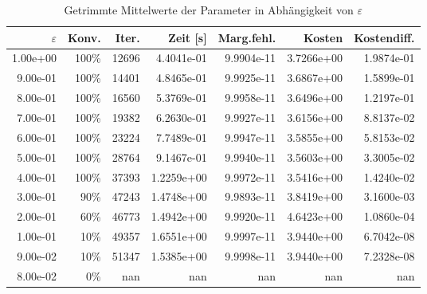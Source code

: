 \begin{table}[htbp]
\caption{Getrimmte Mittelwerte der Parameter in Abhängigkeit von $\varepsilon$}
\label{tab:Parametertest256_tol1e-10}
\small
\centering
{}
\begin{tabular}{rrrrrrr}
\toprule
$\varepsilon$ & Konv. & Iter. & Zeit [s] & Marg.fehl. & Kosten & Kostendiff. \\
\midrule
1.00e+00 & 100\% & 12696 & 4.4041e-01 & 9.9904e-11 & 3.7266e+00 & 1.9874e-01 \\
9.00e-01 & 100\% & 14401 & 4.8465e-01 & 9.9925e-11 & 3.6867e+00 & 1.5899e-01 \\
8.00e-01 & 100\% & 16560 & 5.3769e-01 & 9.9958e-11 & 3.6496e+00 & 1.2197e-01 \\
7.00e-01 & 100\% & 19382 & 6.2630e-01 & 9.9927e-11 & 3.6156e+00 & 8.8137e-02 \\
6.00e-01 & 100\% & 23224 & 7.7489e-01 & 9.9947e-11 & 3.5855e+00 & 5.8153e-02 \\
5.00e-01 & 100\% & 28764 & 9.1467e-01 & 9.9940e-11 & 3.5603e+00 & 3.3005e-02 \\
4.00e-01 & 100\% & 37393 & 1.2259e+00 & 9.9972e-11 & 3.5416e+00 & 1.4240e-02 \\
3.00e-01 & 90\% & 47243 & 1.4748e+00 & 9.9893e-11 & 3.8419e+00 & 3.1600e-03 \\
2.00e-01 & 60\% & 46773 & 1.4942e+00 & 9.9920e-11 & 4.6423e+00 & 1.0860e-04 \\
1.00e-01 & 10\% & 49357 & 1.6551e+00 & 9.9997e-11 & 3.9440e+00 & 6.7042e-08 \\
9.00e-02 & 10\% & 51347 & 1.5385e+00 & 9.9998e-11 & 3.9440e+00 & 7.2328e-08 \\
8.00e-02 & 0\% & nan & nan & nan & nan & nan \\
\bottomrule
\end{tabular}
\end{table}

